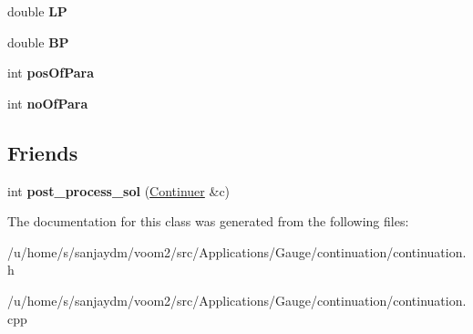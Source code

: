 \begin{DoxyCompactItemize}
\item 
\hypertarget{class_continuer_a627b3dcc3fb3ab7ffe92ece467d27689}{
double {\bfseries LP}}
\label{class_continuer_a627b3dcc3fb3ab7ffe92ece467d27689}

\item 
\hypertarget{class_continuer_a7a8f05077181148ec03d7f304d08505c}{
double {\bfseries BP}}
\label{class_continuer_a7a8f05077181148ec03d7f304d08505c}

\item 
\hypertarget{class_continuer_ad47e2467dda1f25eb68b2aacff5a5e49}{
int {\bfseries posOfPara}}
\label{class_continuer_ad47e2467dda1f25eb68b2aacff5a5e49}

\item 
\hypertarget{class_continuer_a086455304a17a0b59cef9f4e55c1c97e}{
int {\bfseries noOfPara}}
\label{class_continuer_a086455304a17a0b59cef9f4e55c1c97e}

\end{DoxyCompactItemize}
\subsection*{Friends}
\begin{DoxyCompactItemize}
\item 
\hypertarget{class_continuer_adfebb5a3b67701dac638d0db3eecc463}{
int {\bfseries post\_\-process\_\-sol} (\hyperlink{class_continuer}{Continuer} \&c)}
\label{class_continuer_adfebb5a3b67701dac638d0db3eecc463}

\end{DoxyCompactItemize}


The documentation for this class was generated from the following files:\begin{DoxyCompactItemize}
\item 
/u/home/s/sanjaydm/voom2/src/Applications/Gauge/continuation/continuation.h\item 
/u/home/s/sanjaydm/voom2/src/Applications/Gauge/continuation/continuation.cpp\end{DoxyCompactItemize}
